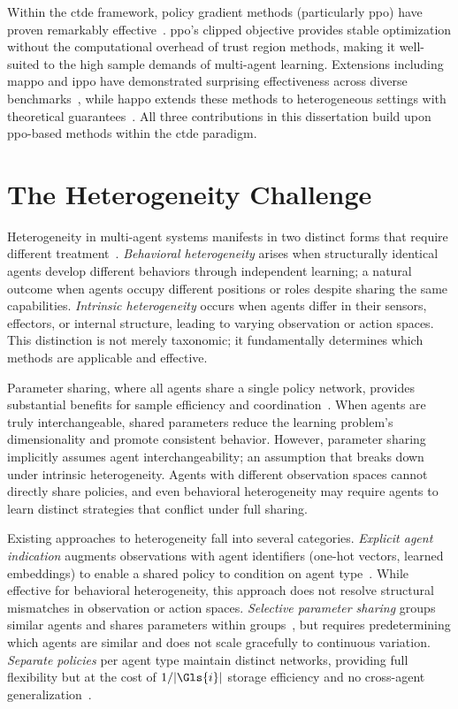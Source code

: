 Within the \gls{ctde} framework, policy gradient methods (particularly \gls{ppo})
have proven remarkably effective~\cite{schulman2017a}. 
\Gls{ppo}'s clipped objective provides stable optimization 
without the computational overhead of trust region methods, 
making it well-suited to the high sample demands of multi-agent learning. 
Extensions including \gls{mappo} and \gls{ippo} have demonstrated 
surprising effectiveness across diverse benchmarks~\cite{yu2022}, 
while \gls{happo} extends these methods to heterogeneous settings 
with theoretical guarantees~\cite{zhong2024}. 
All three contributions in this dissertation build upon 
\gls{ppo}-based methods within the \gls{ctde} paradigm.


\section{The Heterogeneity Challenge}%
\label{sec:intro_heterogeneity}

Heterogeneity in multi-agent systems manifests in two distinct 
forms that require different treatment~\cite{zhong2024,guo2024}. 
\emph{Behavioral heterogeneity} arises when structurally identical 
agents develop different behaviors through independent learning;
a natural outcome when agents occupy different positions or roles 
despite sharing the same capabilities. \emph{Intrinsic heterogeneity}
occurs when agents differ in their sensors, effectors, or internal 
structure, leading to varying observation or action spaces. 
This distinction is not merely taxonomic; it fundamentally 
determines which methods are applicable and effective.

Parameter sharing, where all agents share a single policy network, 
provides substantial benefits for sample efficiency and coordination~\cite{gupta2017}. 
When agents are truly interchangeable, shared parameters reduce the 
learning problem's dimensionality and promote consistent behavior. 
However, parameter sharing implicitly assumes agent interchangeability;
an assumption that breaks down under intrinsic heterogeneity. 
Agents with different observation spaces cannot directly share policies, 
and even behavioral heterogeneity may require agents to learn distinct 
strategies that conflict under full sharing.

Existing approaches to heterogeneity fall into several categories. 
\emph{Explicit agent indication} augments observations with agent identifiers 
(one-hot vectors, learned embeddings) to enable a shared policy to 
condition on agent type~\cite{terry2020}. While effective for behavioral heterogeneity, 
this approach does not resolve structural mismatches in observation or action spaces. 
\emph{Selective parameter sharing} groups similar agents and shares 
parameters within groups~\cite{christianos2021,hao2022}, 
but requires predetermining which agents are similar and 
does not scale gracefully to continuous variation. 
\emph{Separate policies} per agent type maintain distinct networks, 
providing full flexibility but at the cost of \(1/|\Gls{i}|\) storage 
efficiency and no cross-agent generalization~\cite{zhong2024}.

